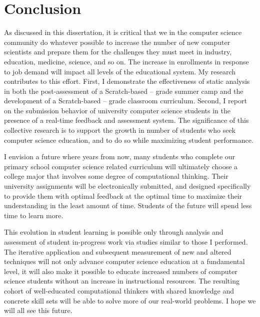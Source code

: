 \chapter{Conclusion} \label{chap:conclusion}

As discussed in this dissertation, it is critical that we in the computer
science community do whatever possible to increase the number of new computer
scientists and prepare them for the challenges they must meet in industry,
education, medicine, science, and so on. The increase in enrollments in
response to job demand will impact all levels of the educational system. My
research contributes to this effort. First, I demonstrate the effectiveness of
static analysis in both the post-assessment of a Scratch-based --
grade summer camp and the development of a Scratch-based -- grade
classroom curriculum. Second, I report on the submission behavior of university
computer science students in the presence of a real-time feedback and
assessment system. The significance of this collective research is to support
the growth in number of students who seek computer science education, and to do
so while maximizing student performance.

I envision a future where years from now, many students who complete our
primary school computer science related curriculum will ultimately choose a
college major that involves some degree of computational thinking. Their
university assignments will be electronically submitted, and designed
specifically to provide them with optimal feedback at the optimal time to
maximize their understanding in the least amount of time. Students of the
future will spend less time to learn more.

This evolution in student learning is possible only through analysis and
assessment of student in-progress work via studies similar to those I
performed. The iterative application and subsequent measurement of new and
altered techniques will not only advance computer science education at a
fundamental level, it will also make it possible to educate increased numbers
of computer science students without an increase in instructional
resources. The resulting cohort of well-educated computational thinkers with
shared knowledge and concrete skill sets will be able to solve more of our
real-world problems. I hope we will all see this future.
